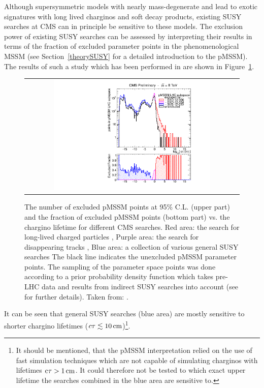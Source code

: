 Although supersymmetric models with nearly mass-degenerate \chipm and \chiO lead to exotic signatures with long lived charginos and soft decay products, existing SUSY searches at CMS can in principle be sensitive to these models. The exclusion power of existing SUSY searches can be assessed by interpreting their results in terms of the fraction of excluded parameter points in the phenomenological MSSM (see Section~\ref{theorySUSY} for a detailed introduction to the pMSSM). The results of such a study which has been performed in \cite{bib:CMS:DT_8TeV} are shown in Figure~\ref{fig:pMSSMplot}. 
\begin{figure}[!t]
  \centering 
  \begin{tabular}{c}
    \includegraphics[width=0.75\textwidth]{figures/analysis/pMSSM_vs_ctau.pdf}
  \end{tabular}
  \caption{The number of excluded pMSSM points at 95\% C.L. (upper part) and the fraction of excluded pMSSM points (bottom part) vs. the chargino lifetime for different CMS searches.
           Red area: the search for long-lived charged particles \cite{bib:CMS:HSCP_8TeV},
           Purple area: the search for disappearing tracks  \cite{bib:CMS:DT_8TeV},
           Blue area: a collection of various general SUSY searches \cite{bib:CMS:pMSSMinterpretation_7TeV_PAS}
           The black line indicates the unexcluded pMSSM parameter points.
           The sampling of the parameter space points was done according to a prior probability density function which takes pre-LHC data and results from indirect SUSY searches into account (see \cite{bib:CMS:HSCPReinterpreation_PAS} for further details).
           Taken from: \cite{bib:pMSSMplot_source_from_DT}.}
  \label{fig:pMSSMplot}
\end{figure}
It can be seen that general SUSY searches (blue area) are mostly sensitive to shorter chargino lifetimes ($c\tau \lesssim 10\,\text{cm}$)\footnote{It should be mentioned, that the pMSSM interpretation relied on the use of fast simulation techniques which are not capable of simulating charginos with lifetimes $\text{c}\tau>1\,\text{cm}$. It could therefore not be tested to which exact upper lifetime the searches combined in the blue area are sensitive to.}. 
